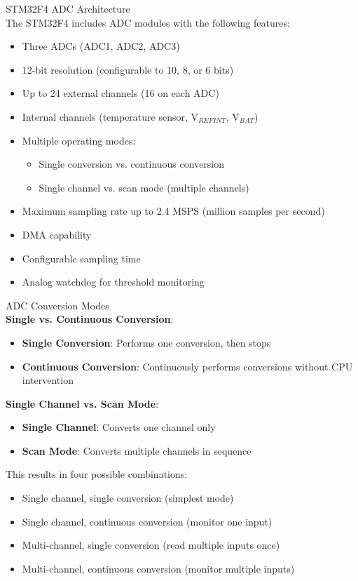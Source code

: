 \begin{concept}{STM32F4 ADC Architecture}\\
The STM32F4 includes ADC modules with the following features:
\begin{itemize}
    \item Three ADCs (ADC1, ADC2, ADC3)
    \item 12-bit resolution (configurable to 10, 8, or 6 bits)
    \item Up to 24 external channels (16 on each ADC)
    \item Internal channels (temperature sensor, V$_{REFINT}$, V$_{BAT}$)
    \item Multiple operating modes:
    \begin{itemize}
        \item Single conversion vs. continuous conversion
        \item Single channel vs. scan mode (multiple channels)
    \end{itemize}
    \item Maximum sampling rate up to 2.4 MSPS (million samples per second)
    \item DMA capability
    \item Configurable sampling time
    \item Analog watchdog for threshold monitoring
\end{itemize}
\end{concept}

\begin{definition}{ADC Conversion Modes}\\
\textbf{Single vs. Continuous Conversion}:
\begin{itemize}
    \item \textbf{Single Conversion}: Performs one conversion, then stops
    \item \textbf{Continuous Conversion}: Continuously performs conversions without CPU intervention
\end{itemize}
\textbf{Single Channel vs. Scan Mode}:
\begin{itemize}
    \item \textbf{Single Channel}: Converts one channel only
    \item \textbf{Scan Mode}: Converts multiple channels in sequence
\end{itemize}
This results in four possible combinations:
\begin{itemize}
    \item Single channel, single conversion (simplest mode)
    \item Single channel, continuous conversion (monitor one input)
    \item Multi-channel, single conversion (read multiple inputs once)
    \item Multi-channel, continuous conversion (monitor multiple inputs)
\end{itemize}
\end{definition}

